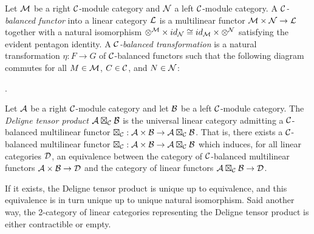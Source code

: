 \documentclass{amsart}
\begin{document}
\begin{definition}
	Let $\mathcal M$ be a right $\mathcal C$-module category and $\mathcal N$ a left $\mathcal C$-module category. A {\em $\mathcal C$-balanced functor} into a linear category $\mathcal L$ is a multilinear functor $\mathcal M \times \mathcal N \to \mathcal L$ together with a natural isomorphism $\otimes^{\mathcal M} \times id_{\mathcal N} \cong id_{\mathcal M} \times \otimes^{\mathcal N}$ satisfying the evident pentagon identity. A {\em $\mathcal C$-balanced transformation} is a natural transformation $\eta:F \to G$ of $\mathcal C$-balanced functors such that the following diagram commutes for all $M \in \mathcal M$, $C \in \mathcal C$, and $N \in \mathcal N$:
\begin{center}
.
\end{center}
\end{definition}


\begin{definition}
	Let $\mathcal A$ be a right $\mathcal C$-module category and let $\mathcal B$ be a left $\mathcal C$-module category. The {\em Deligne tensor product $\mathcal A \boxtimes_{\mathcal C} \mathcal B$} is the universal linear category admitting a $\mathcal C$-balanced multilinear functor $\boxtimes_{\mathcal C}: \mathcal A \times \mathcal B \to \mathcal A \boxtimes_{\mathcal C} \mathcal B$. That is, there exists a $\mathcal C$-balanced multilinear functor $\boxtimes_{\mathcal C}: \mathcal A \times \mathcal B \to \mathcal A \boxtimes_{\mathcal C} \mathcal B$ which induces, for all linear categories $\mathcal D$, an equivalence between the category of $\mathcal C$-balanced multilinear functors $\mathcal A \times \mathcal B \to \mathcal D$ and the category of linear functors $\mathcal A \boxtimes_{\mathcal C} \mathcal B \to \mathcal D$. 
\end{definition}

If it exists, the Deligne tensor product is unique up to equivalence, and this equivalence is in turn unique up to unique natural isomorphism. Said another way, the 2-category of linear categories representing the Deligne tensor product is either contractible or empty. 
\end{document}
